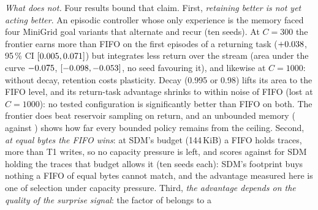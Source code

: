 \documentclass[conference]{IEEEtran}
\begin{document}
\emph{What does not.} Four results bound that claim. First, \emph{retaining
better is not yet acting better}. An episodic controller \cite{pritzel2017}
whose only experience is the memory faced four MiniGrid goal variants that
alternate and recur (ten seeds). At $C=300$ the frontier earns more than FIFO
on the first episodes of a returning task
($+\result{exp13_downstream_learning:resumen.C300.diferencias_pareadas.frontera_menos_FIFO.reaparicion.media|f3}{0.038}$,
95\,\% CI
$[\result{exp13_downstream_learning:resumen.C300.diferencias_pareadas.frontera_menos_FIFO.reaparicion.ci_low|f3}{0.005},
\result{exp13_downstream_learning:resumen.C300.diferencias_pareadas.frontera_menos_FIFO.reaparicion.ci_high|f3}{0.071}]$)
but integrates less return over the stream (area under the curve
$\result{exp13_downstream_learning:resumen.C300.diferencias_pareadas.frontera_menos_FIFO.auc.media|f3}{-0.075}$,
$[\result{exp13_downstream_learning:resumen.C300.diferencias_pareadas.frontera_menos_FIFO.auc.ci_low|f3}{-0.098},
\result{exp13_downstream_learning:resumen.C300.diferencias_pareadas.frontera_menos_FIFO.auc.ci_high|f3}{-0.053}]$,
no seed favouring it), and likewise at $C=1000$: without decay, retention costs
plasticity. Decay (0.995 or 0.98) lifts its area to the FIFO level, and its
return-task advantage shrinks to within noise of FIFO (lost at $C=1000$): no
tested configuration is significantly better than FIFO on both. The frontier
does beat reservoir sampling on return, and an unbounded memory
(
against )
shows how far every bounded policy remains from the ceiling. Second, \emph{at
equal bytes the FIFO wins}: at SDM's budget (144\,KiB) a FIFO holds
traces, more than T1 writes, so no capacity pressure is left, and scores
against
for SDM holding the
traces that budget allows it (ten seeds each):
SDM's footprint buys nothing a FIFO of equal bytes cannot match, and the
advantage measured here is one of selection under capacity pressure. Third, \emph{the advantage depends on the quality of the
surprise signal}: the factor of
 belongs to a
\end{document}
